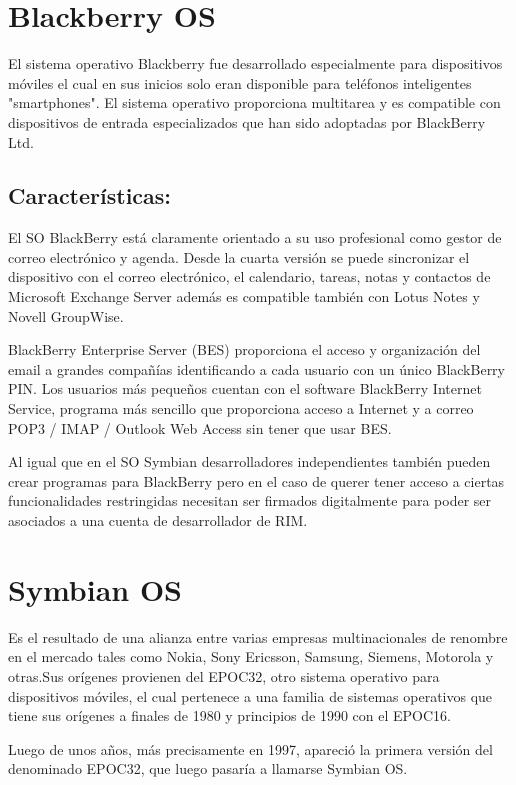 \section*{Blackberry OS}
El sistema operativo Blackberry fue desarrollado especialmente para dispositivos  móviles el cual en sus inicios solo eran disponible para teléfonos inteligentes 
"smartphones". El sistema operativo proporciona multitarea y es compatible con dispositivos de entrada especializados que han sido adoptadas por BlackBerry Ltd.

\subsection*{Características:}
El SO BlackBerry está claramente orientado a su uso profesional como gestor de correo electrónico y agenda. Desde la cuarta versión se puede sincronizar el dispositivo con el correo electrónico, el calendario, tareas, notas y contactos de Microsoft Exchange Server además es compatible también con Lotus Notes y Novell GroupWise.

BlackBerry Enterprise Server (BES) proporciona el acceso y organización del email a grandes compañías identificando a cada usuario con un único BlackBerry PIN. Los usuarios más pequeños cuentan con el software BlackBerry Internet Service, programa más sencillo que proporciona acceso a Internet y a correo POP3 / IMAP / Outlook Web Access sin tener que usar BES.

Al igual que en el SO Symbian desarrolladores independientes también pueden crear programas para BlackBerry pero en el caso de querer tener acceso a ciertas funcionalidades restringidas necesitan ser firmados digitalmente para poder ser asociados a una cuenta de desarrollador de RIM.



\section*{Symbian OS}
Es el resultado de una alianza entre varias empresas multinacionales de renombre en el mercado tales como Nokia, Sony Ericsson, Samsung, Siemens, Motorola y otras.Sus 
orígenes provienen del EPOC32, otro sistema operativo para dispositivos móviles, el cual pertenece a una familia de sistemas operativos que tiene sus orígenes a finales de 
1980 y principios de 1990 con el EPOC16.

Luego de unos años, más precisamente en 1997, apareció la primera versión del denominado EPOC32, que luego pasaría a llamarse Symbian OS.

